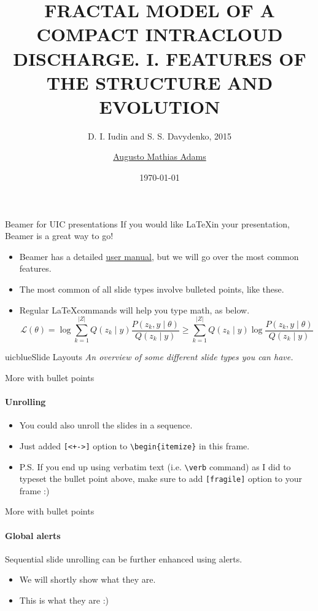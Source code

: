 \documentclass{beamer}
\title{FRACTAL MODEL OF A COMPACT INTRACLOUD DISCHARGE. I. FEATURES OF THE STRUCTURE AND EVOLUTION}
\subtitle{D. I. Iudin and S. S. Davydenko, 2015}
\author{\href{mailto:augusto.adamns@ufpr.br}{Augusto Mathias Adams}}
\date{\today}
\newcommand{\hrefcol}[2]{\textcolor{uihteal}{\href{#1}{#2}}}
\begin{document}
\maketitle
{}

\begin{frame}{Beamer for UIC presentations}
	If you would like \LaTeX in your presentation, Beamer is a great way to go!
	\begin{itemize}
		\item Beamer has a detailed
		\hrefcol{https://www.ctan.org/tex-archive/macros/latex/contrib/beamer/doc/beameruserguide.pdf}{user
		 manual}, but we will go over the most common features.
		\item The most common of all slide types involve bulleted points, like these.
		\item Regular \LaTeX commands will help you type math, as below.
		\begin{equation*}
		\mathcal{L} (\theta) = \log \sum_{k=1}^{\lvert Z \rvert} Q(z_k \mid y) \frac{P( z_k,  y \mid \theta)}{Q(z_k \mid y)} \geq \sum_{k=1}^{\lvert Z \rvert} Q(z_k \mid y) \log \frac{P( z_k,  y \mid \theta)}{Q(z_k \mid y)}
		\end{equation*}
	\end{itemize}
\end{frame}


\begin{chapter}{uicblue}{Slide Layouts}
\textit{An overview of some different slide types you can have.}
\end{chapter}


\begin{frame}[fragile]{More with bullet points}
\framesubtitle{Unrolling}
\begin{itemize}[<+->]
\item You could also unroll the slides in a sequence.
\item Just added \verb|[<+->]| option to \verb|\begin{itemize}| in this frame.
\item P.S. If you end up using verbatim text (i.e. \verb|\verb| command) as I did to typeset the bullet point above, make sure to add \verb|[fragile]| option to your frame :)
\end{itemize}
\end{frame}


\begin{frame}[fragile]{More with bullet points}
\framesubtitle{Global alerts}
Sequential slide unrolling can be further enhanced using alerts.
\begin{itemize}[<alert@2>]
\item We will shortly show what they are.
\item<2- | alert@2> This is what they are :)
\end{itemize}
\end{frame}
\end{document}
